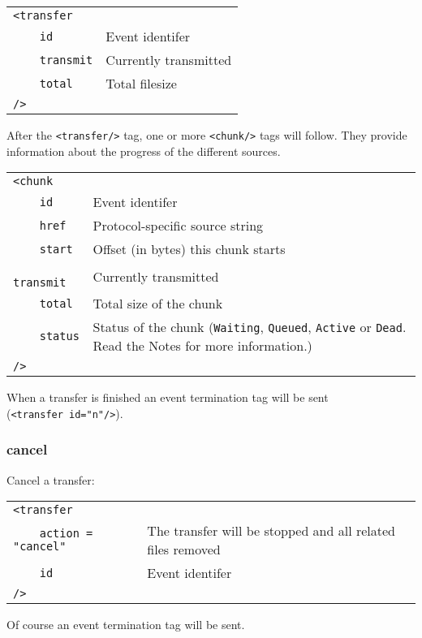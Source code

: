 \documentclass[10pt]{article}
\begin{document}
\begin{tabular}{p{2.6cm}p{8.5cm}}
\verb|<transfer|    &  \\
\verb|    id|           & Event identifer \\
\verb|    transmit|     & Currently transmitted \\
\verb|    total|        & Total filesize \\
\verb|/>|           &
\end{tabular}

After the \verb|<transfer/>| tag, one or more \verb|<chunk/>| tags will follow.
They provide information about the progress of the different sources.

\begin{tabular}{p{2.6cm}p{8.5cm}}
\verb|<chunk|    &  \\
\verb|    id|           & Event identifer \\
\verb|    href|         & Protocol-specific source string \\
\verb|    start|        & Offset (in bytes) this chunk starts \\
\verb|    transmit|     & Currently transmitted \\
\verb|    total|        & Total size of the chunk \\
\verb|    status|       & Status of the chunk (\verb|Waiting|, \verb|Queued|, \verb|Active| or \verb|Dead|. Read the Notes for more information.) \\
\verb|/>|           &
\end{tabular}

When a transfer is finished an event termination tag will be sent \\
(\verb|<transfer id="n"/>|).
  
\subsubsection{cancel}
Cancel a transfer:

\begin{tabular}{p{3.9cm}p{7.2cm}}
\verb|<transfer|    &  \\
\verb|    action = "cancel"| & The transfer will be stopped and all related files removed \\
\verb|    id|       & Event identifer \\
\verb|/>|           &
\end{tabular}

Of course an event termination tag will be sent.
\end{document}
